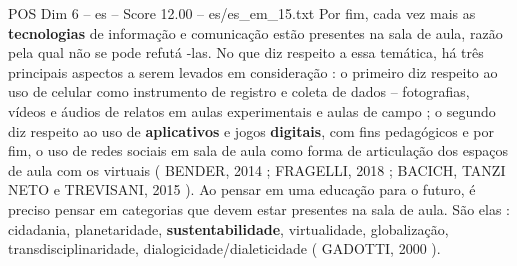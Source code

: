 \begin{textsample}{POS Dim 6 – es – Score 12.00 – es/es\_em\_15.txt}
Por fim, cada vez mais as \textbf{tecnologias} de informação e comunicação estão presentes na sala de aula, razão pela qual não se pode refutá -las.
No que diz respeito a essa temática, há três principais aspectos a serem levados em consideração : o primeiro diz respeito ao uso de celular como instrumento de registro e coleta de dados – fotografias, vídeos e áudios de relatos em aulas experimentais e aulas de campo ; o segundo diz respeito ao uso de \textbf{aplicativos} e jogos \textbf{digitais}, com fins pedagógicos e por fim, o uso de redes sociais em sala de aula como forma de articulação dos espaços de aula com os virtuais ( BENDER, 2014 ; FRAGELLI, 2018 ; BACICH, TANZI NETO e TREVISANI, 2015 ).
Ao pensar em uma educação para o futuro, é preciso pensar em categorias que devem estar presentes na sala de aula.
São elas : cidadania, planetaridade, \textbf{sustentabilidade}, virtualidade, globalização, transdisciplinaridade, dialogicidade/dialeticidade ( GADOTTI, 2000 ).

\end{textsample}
